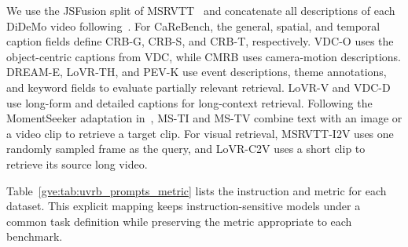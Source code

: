 We use the JSFusion split of MSRVTT~\cite{yu2018joint} and concatenate all descriptions of each DiDeMo video following~\cite{liu2019use}. For CaReBench, the general, spatial, and temporal caption fields define CRB-G, CRB-S, and CRB-T, respectively. VDC-O uses the object-centric captions from VDC, while CMRB uses camera-motion descriptions. DREAM-E, LoVR-TH, and PEV-K use event descriptions, theme annotations, and keyword fields to evaluate partially relevant retrieval. LoVR-V and VDC-D use long-form and detailed captions for long-context retrieval. Following the MomentSeeker adaptation in~\cite{meng2025vlm2vec}, MS-TI and MS-TV combine text with an image or a video clip to retrieve a target clip. For visual retrieval, MSRVTT-I2V uses one randomly sampled frame as the query, and LoVR-C2V uses a short clip to retrieve its source long video.

Table~\ref{gve:tab:uvrb_prompts_metric} lists the instruction and metric for each dataset. This explicit mapping keeps instruction-sensitive models under a common task definition while preserving the metric appropriate to each benchmark.

